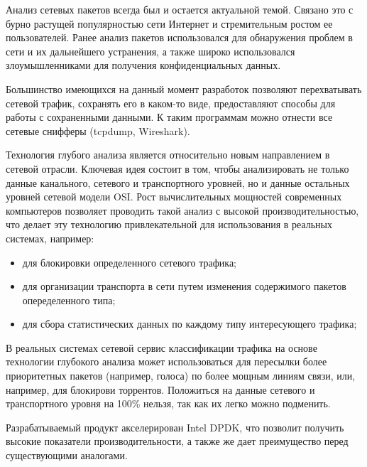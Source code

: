 \Introduction
Анализ сетевых пакетов всегда был и остается актуальной темой. Связано это с бурно растущей популярностью сети Интернет и стремительным ростом ее пользователей. Ранее анализ пакетов использовался для обнаружения проблем в сети и их дальнейшего устранения, а также широко использовался злоумышленниками для получения конфиденциальных данных.

Большинство имеющихся на данный момент разработок позволяют перехватывать сетевой трафик, сохранять его в каком-то виде, предоставляют способы для работы с сохраненными данными. К таким программам можно отнести все сетевые снифферы (tcpdump, Wireshark).

Технология глубого анализа является относительно новым направлением в сетевой отрасли. Ключевая идея состоит в том, чтобы анализировать не только данные канального, сетевого и транспортного уровней, но и данные остальных уровней сетевой модели OSI. Рост вычислительных мощностей современных компьютеров позволяет проводить такой анализ с высокой производительностью, что делает эту технологию привлекательной для использования в реальных системах, например:
\begin{itemize}
\item для блокировки определенного сетевого трафика;
\item для организации транспорта в сети путем изменения содержимого пакетов опеределенного типа;
\item для сбора статистических данных по каждому типу интересующего трафика;
\end{itemize}

В реальных системах сетевой сервис классификации трафика на основе технологии глубокого анализа может использоваться для пересылки более приоритетных пакетов (например, голоса) по более мощным линиям связи, или, например, для блокирови торрентов. Положиться на данные сетевого и транспортного уровня на 100\% нельзя, так как их легко можно подменить.

Разрабатываемый продукт акселерирован Intel DPDK, что позволит получить высокие показатели производительности, а также же дает преимущество перед существующими аналогами.
